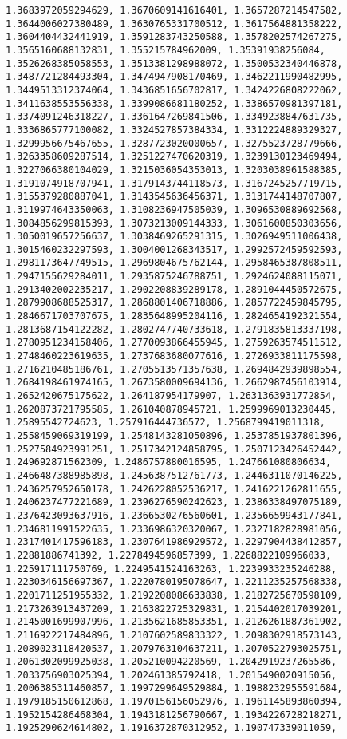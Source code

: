 \documentclass[11pt]{article}
\begin{document}
\begin{Verbatim}[commandchars=\\\{\}]
1.3683972059294629, 1.3670609141616401, 1.3657287214547582, 1.3644006027380489, 1.3630765331700512, 1.3617564881358222, 1.3604404432441919, 1.3591283743250588, 1.3578202574267275, 1.3565160688132831, 1.355215784962009, 1.35391938256084, 1.3526268385058553, 1.3513381298988072, 1.3500532340446878, 1.3487721284493304, 1.3474947908170469, 1.3462211990482995, 1.3449513312374064, 1.3436851656702817, 1.3424226808222062, 1.3411638553556338, 1.3399086681180252, 1.3386570981397181, 1.3374091246318227, 1.3361647269841506, 1.3349238847631735, 1.3336865777100082, 1.3324527857384334, 1.3312224889329327, 1.3299956675467655, 1.3287723020000657, 1.3275523728779666, 1.3263358609287514, 1.3251227470620319, 1.3239130123469494, 1.3227066380104029, 1.3215036054353013, 1.3203038961588385, 1.3191074918707941, 1.3179143744118573, 1.3167245257719715, 1.3155379280887041, 1.3143545636456371, 1.3131744148707807, 1.3119974643350063, 1.3108236947505039, 1.3096530889692568, 1.3084856299815393, 1.3073213009144333, 1.3061600850303656, 1.3050019657256637, 1.3038469265291315, 1.3026949511006438, 1.3015460232297593, 1.3004001268343517, 1.2992572459592593, 1.2981173647749515, 1.2969804675762144, 1.2958465387808511, 1.2947155629284011, 1.2935875246788751, 1.2924624088115071, 1.2913402002235217, 1.2902208839289178, 1.2891044450572675, 1.2879908688525317, 1.2868801406718886, 1.2857722459845795, 1.2846671703707675, 1.2835648995204116, 1.2824654192321554, 1.2813687154122282, 1.2802747740733618, 1.2791835813337198, 1.2780951234158406, 1.2770093866455945, 1.2759263574511512, 1.2748460223619635, 1.2737683680077616, 1.2726933811175598, 1.2716210485186761, 1.2705513571357638, 1.2694842939898554, 1.2684198461974165, 1.2673580009694136, 1.2662987456103914, 1.2652420675175622, 1.264187954179907, 1.2631363931772854, 1.2620873721795585, 1.261040878945721, 1.2599969013230445, 1.25895542724623, 1.257916444736572, 1.2568799419011318, 1.2558459069319199, 1.2548143281050896, 1.2537851937801396, 1.2527584923991251, 1.2517342124858795, 1.2507123426452442, 1.249692871562309, 1.2486757880016595, 1.247661080806634, 1.2466487388985898, 1.2456387512761773, 1.2446311070146225, 1.2436257952650178, 1.2426228052536217, 1.2416221262811655, 1.2406237477221689, 1.2396276590242623, 1.2386338497075189, 1.2376423093637916, 1.2366530276560601, 1.2356659943177841, 1.2346811991522635, 1.2336986320320067, 1.2327182828981056, 1.2317401417596183, 1.2307641986929572, 1.2297904438412857, 1.22881886741392, 1.2278494596857399, 1.2268822109966033, 1.225917111750769, 1.2249541524163263, 1.2239933235246288, 1.2230346156697367, 1.2220780195078647, 1.2211235257568338, 1.2201711251955332, 1.2192208086633838, 1.2182725670598109, 1.2173263913437209, 1.2163822725329831, 1.2154402017039201, 1.2145001699907996, 1.2135621685853351, 1.2126261887361902, 1.2116922217484896, 1.2107602589833322, 1.2098302918573143, 1.2089023118420537, 1.2079763104637211, 1.2070522793025751, 1.2061302099925038, 1.205210094220569, 1.2042919237265586, 1.2033756903025394, 1.202461385792418, 1.2015490020915056, 1.2006385311460857, 1.1997299649529884, 1.1988232955591684, 1.1979185150612868, 1.1970156156052976, 1.1961145893860394, 1.1952154286468304, 1.1943181256790667, 1.1934226728218271, 1.1925290624614802, 1.1916372870312952, 1.190747339011059, 
\end{Verbatim}
\end{document}
